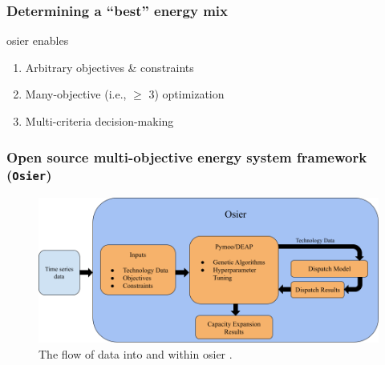 \begin{frame}
    \frametitle{Determining a ``best'' energy mix}
    \Gls{osier} enables
            \begin{enumerate}
                \item Arbitrary objectives \& constraints
                \item Many-objective (i.e., $\geq$ 3) optimization
                \item Multi-criteria decision-making
            \end{enumerate}
\end{frame}

\begin{frame}
    \frametitle{Open source multi-objective energy system framework (\texttt{Osier})}
    \begin{figure}
        \centering
        \includegraphics[width=\columnwidth]{figures/osier_flow}
        \caption{The flow of data into and within \Gls{osier} \cite{dotson_osier_2024}.}
        \label{fig:osier_flow}
    \end{figure}

\end{frame}

